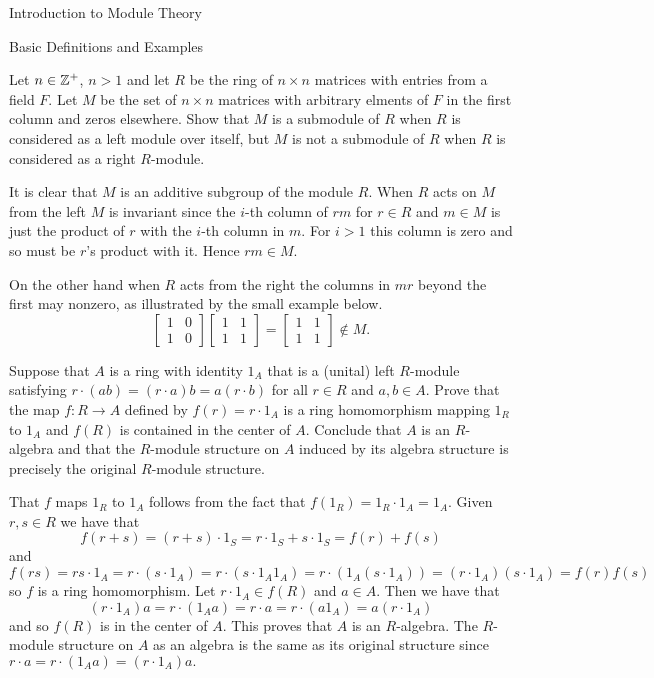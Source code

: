 \begin{chapter}{Introduction to Module Theory}
\begin{section}{Basic Definitions and Examples}
\begin{problem}\label{ex:10.1.21}
Let $n\in \mathbb{Z}^+$, $n>1$ and let $R$ be the ring of $n\times n$ matrices with entries from a field $F$. Let $M$ be the set of $n\times n$ matrices with arbitrary elments of $F$ in the first column and zeros elsewhere. Show that $M$ is a submodule of $R$ when $R$ is considered as a left module over itself, but $M$ is not a submodule of $R$ when $R$ is considered as a right $R$-module.
\end{problem}
\begin{solution}
It is clear that $M$ is an additive subgroup of the module $R$. When $R$ acts on $M$ from the left $M$ is invariant since the $i$-th column of $rm$ for $r\in R$ and $m\in M$ is just the product of $r$ with the $i$-th column in $m$. For $i>1$ this column is zero and so must be $r$'s product with it. Hence $rm\in M$. 

On the other hand when $R$ acts from the right the columns in $mr$ beyond the first may nonzero, as illustrated by the small example below.\[
\begin{bmatrix}
1&0\\
1&0
\end{bmatrix}\begin{bmatrix}
1&1\\
1&1
\end{bmatrix} = \begin{bmatrix}
1&1\\
1&1
\end{bmatrix} \notin M.
\]
\end{solution}\oneperpage



\begin{problem}\label{ex:10.1.22}
Suppose that $A$ is a ring with identity $1_A$ that is a (unital) left $R$-module satisfying $r\cdot(ab) = (r\cdot a)b = a(r\cdot b)$ for all $r\in R$ and $a,b\in A$. Prove that the map $f:R\to A$ defined by $f(r) = r\cdot 1_A$ is a ring homomorphism mapping $1_R$ to $1_A$ and $f(R)$ is contained in the center of $A$. Conclude that $A$ is an $R$-algebra and that the $R$-module structure on $A$ induced by its algebra structure is precisely the original $R$-module structure.
\end{problem}
\begin{solution}
That $f$ maps $1_R$ to $1_A$ follows from the fact that $f(1_R) = 1_R\cdot 1_A = 1_A$. Given $r,s\in R$ we have that \[
f(r+s) = (r+s)\cdot 1_S = r\cdot 1_S + s\cdot 1_S = f(r)+f(s)
\]
and \[
f(rs) = rs\cdot 1_A  = r\cdot (s\cdot 1_A) = r\cdot (s\cdot 1_A1_A) = r\cdot (1_A(s\cdot 1_A)) = (r\cdot 1_A)(s\cdot 1_A) = f(r)f(s)
\]
so $f$ is a ring homomorphism. Let $r\cdot 1_A \in f(R)$ and $a\in A$. Then we have that \[
(r\cdot 1_A)a = r\cdot (1_A a) = r\cdot a = r\cdot (a1_A) = a(r\cdot 1_A) 
\]
and so $f(R)$ is in the center of $A$. This proves that $A$ is an $R$-algebra. The $R$-module structure on $A$ as an algebra is the same as its original structure since $r\cdot a = r\cdot (1_A a) = (r\cdot 1_A)a.$



\end{solution}
\end{section}
\end{chapter}
